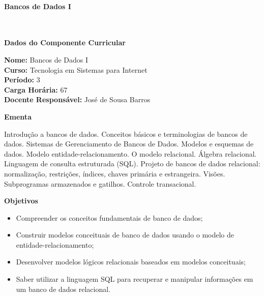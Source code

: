 \paragraph{Bancos de Dados I} \


\begin{snugshade}\begin{center}\textbf{
	Dados do Componente Curricular
}\end{center}\end{snugshade}

\noindent 	\textbf{Nome:} Bancos de Dados I
\\ 			\textbf{Curso:} Tecnologia em Sistemas para Internet
\\ 			\textbf{Período:} \unit{3}{\degree}
\\ 			\textbf{Carga Horária:} \unit{67}{\hour}
\\ 			\textbf{Docente Responsável:} José de Sousa Barros 


\begin{snugshade}\begin{center}\textbf{
    Ementa
\vphantom{q}}\end{center}\end{snugshade}

\noindent
Introdução a bancos de dados. Conceitos básicos e terminologias de bancos de dados. Sistemas de Gerenciamento de Bancos de Dados. Modelos e esquemas de dados. Modelo entidade-relacionamento. O modelo relacional. Álgebra relacional. Linguagem de consulta estruturada (SQL). Projeto de bancos de dados relacional: normalização, restrições, índices, chaves primária e estrangeira. Visões. Subprogramas armazenados e gatilhos. Controle transacional.

\begin{snugshade}\begin{center}\textbf{
    Objetivos
}\end{center}\end{snugshade}


\begin{itemize}

\item Compreender os conceitos fundamentais de banco de dados;
\item Construir modelos conceituais de banco de dados usando o modelo de entidade-relacionamento;
\item Desenvolver modelos lógicos relacionais baseados em modelos conceituais;
\item Saber utilizar a linguagem SQL para recuperar e manipular informações em um banco de dados relacional.

\end{itemize}

